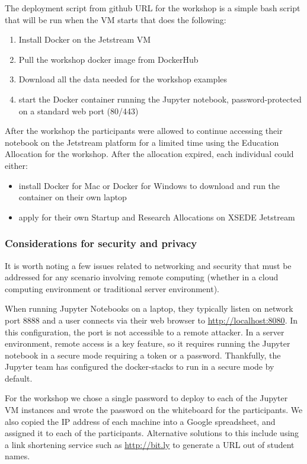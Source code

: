 The deployment script from github URL for the workshop is a simple bash script
that will be run when the VM starts that does the following:

\begin{enumerate}
\item Install Docker on the Jetstream VM
\item Pull the workshop docker image from DockerHub
\item Download all the data needed for the workshop examples
\item start the Docker container running the Jupyter notebook, password-protected on a standard web port (80/443)
\end{enumerate}

After the workshop the participants were allowed to continue accessing their
notebook on the Jetstream platform for a limited time using the Education
Allocation for the workshop. After the allocation expired, each individual could
either:

\begin{itemize}

\item install Docker for Mac or Docker for Windows to download and run the
      container on their own laptop
\item apply for their own Startup and Research Allocations on XSEDE Jetstream

\end{itemize}

\subsubsection{Considerations for security and privacy}

It is worth noting a few issues related to networking and security that must be
addressed for any scenario involving remote computing (whether in a cloud
computing environment or traditional server environment).

When running Jupyter Notebooks on a laptop, they typically listen on network
port 8888 and a user connects via their web browser to
\url{http://localhost:8080}. In this configuration, the port is not accessible
to a remote attacker. In a server environment, remote access is a key
feature, so it requires running the Jupyter notebook in a secure mode requiring
a token or a password. Thankfully, the Jupyter team has configured the
docker-stacks to run in a secure mode by default.

For the workshop we chose a single password to deploy to each of the Jupyter VM
instances and wrote the password on the whiteboard for the participants. We also
copied the IP address of each machine into a Google spreadsheet, and assigned it to
each of the participants. Alternative solutions to this include using a link
shortening service such as \url{http://bit.ly} to generate a URL out of
student names.

